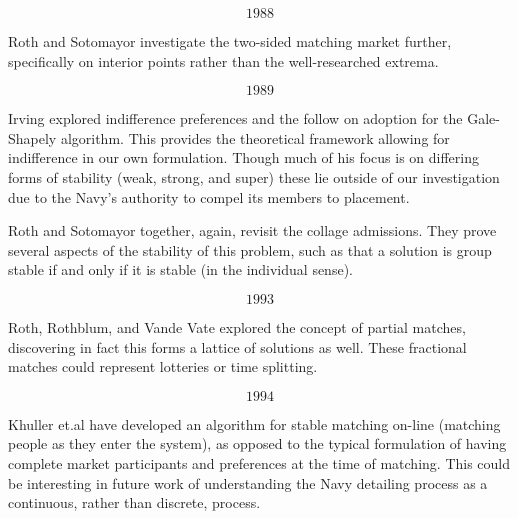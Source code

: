 \[1988\]

Roth and Sotomayor investigate the two-sided matching market further, specifically on interior points rather than the well-researched extrema. \cite{1988_Roth_Sotomayor}

\[1989\]

Irving explored indifference preferences and the follow on adoption for the Gale-Shapely algorithm. \cite{1989_Irving} This provides the theoretical framework allowing for indifference in our own formulation. Though much of his focus is on differing forms of stability (weak, strong, and super) these lie outside of our investigation due to the Navy's authority to compel its members to placement.

Roth and Sotomayor together, again, revisit the collage admissions. \cite{1989_Roth} They prove several aspects of the stability of this problem, such as that a solution is group stable if and only if it is stable (in the individual sense).


\[1993\]

Roth, Rothblum, and Vande Vate explored the concept of partial matches, discovering in fact this forms a lattice of solutions as well. These fractional matches could represent lotteries or time splitting. \cite{1993_Roth}

\[1994\]

Khuller et.al have developed an algorithm for stable matching on-line (matching people as they enter the system), as opposed to the typical formulation of having complete market participants and preferences at the time of matching. \cite{1994_Khuller} This could be interesting in future work of understanding the Navy detailing process as a continuous, rather than discrete, process.